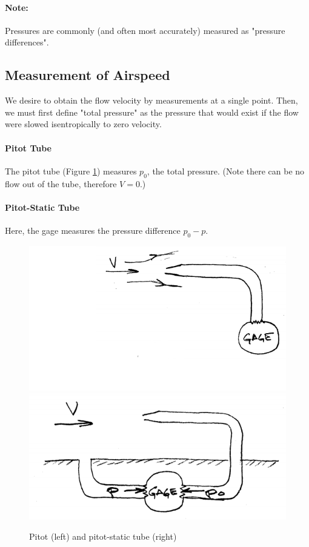 \documentclass[draft=false, titlepage]{article}
\begin{document}
\paragraph*{Note:} Pressures are commonly (and often most accurately) measured as "pressure differences".

\subsection{Measurement of Airspeed}
We desire to obtain the flow velocity by measurements at a single point. Then, we must first define "total pressure" as the pressure that would exist if the flow were slowed isentropically to zero velocity.
\paragraph*{Pitot Tube}
The pitot tube (Figure \ref{fig:p11_pitotStatic}) measures $p_0$, the total pressure. (Note there can be no flow out of the tube, therefore $V=0$.)
\paragraph*{Pitot-Static Tube}
Here, the gage measures the pressure difference $p_0-p$.

\begin{figure}[ht]
	\centering
	\includegraphics[width=0.4\linewidth]{Figures/p11_pitot.PNG}
	\includegraphics[width=0.4\linewidth]{Figures/p11_pitotStatic.PNG}
	\caption{Pitot (left) and pitot-static tube (right)}
	\label{fig:p11_pitotStatic}
\end{figure}
\end{document}
